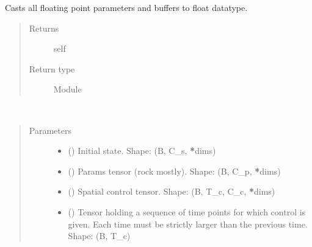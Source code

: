 \documentclass[letterpaper,10pt,english]{sphinxmanual}
\begin{document}
\begin{fulllineitems}
\begin{fulllineitems}
\label{\detokenize{api/dynamics:geology.metamodelling.dynamics.LatentSpaceDynamics.float}}
Casts all floating point parameters and buffers to float datatype.
\begin{quote}\begin{description}
\item[{Returns}] \leavevmode
self

\item[{Return type}] \leavevmode
Module

\end{description}\end{quote}

\end{fulllineitems}


\begin{fulllineitems}
\label{\detokenize{api/dynamics:geology.metamodelling.dynamics.LatentSpaceDynamics.forward}}~\begin{quote}\begin{description}
\item[{Parameters}] \leavevmode\begin{itemize}
\item {} 
 () \textendash{} Initial state. Shape: (B, C\_s, {\color{red}\bfseries{}*}dims)

\item {} 
 () \textendash{} Params tensor (rock mostly). Shape: (B, C\_p, {\color{red}\bfseries{}*}dims)

\item {} 
 () \textendash{} Spatial control tensor. Shape: (B, T\_c, C\_c, {\color{red}\bfseries{}*}dims)

\item {} 
 () \textendash{} Tensor holding a sequence of time points for which control is given.
Each time must be strictly larger than the previous time. Shape: (B, T\_c)


\end{itemize}
\end{description}
\end{quote}
\end{fulllineitems}
\end{fulllineitems}
\end{document}
